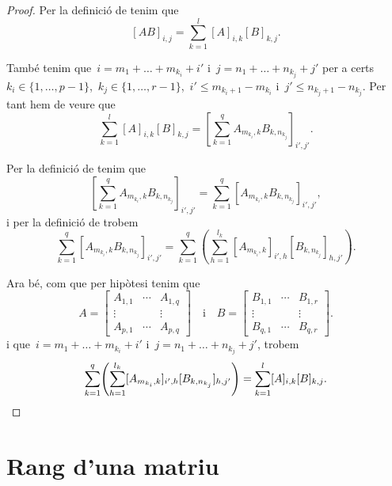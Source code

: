 \documentclass[../algebra-lineal.tex]{subfiles}
\begin{document}
    \begin{proof}
        Per la definició de  tenim que
        \[
            [AB]_{i,j}=\sum_{k=1}^{l}[A]_{i,k}[B]_{k,j}.
        \]

        També tenim que~\(i=m_{1}+\dots+m_{k_{i}}+i'\) i~\(j=n_{1}+\dots+n_{k_{j}}+j'\) per a certs~\(k_{i}\in\{1,\dots,p-1\}\),~\(k_{j}\in\{1,\dots,r-1\}\),~\(i'\leq m_{k_{i}+1}-m_{k_{i}}\) i~\(j'\leq n_{k_{j}+1}-n_{k_{j}}\).
        Per tant hem de veure que
        \[
            \sum_{k=1}^{l}[A]_{i,k}[B]_{k,j}=\left[\sum_{k=1}^{q}A_{m_{k_{i}},k}B_{k,n_{k_{j}}}\right]_{i',j'}.
        \]

        Per la definició de  tenim que
        \[
            \left[\sum_{k=1}^{q}A_{m_{k_{i}},k}B_{k,n_{k_{j}}}\right]_{i',j'}=\sum_{k=1}^{q}[A_{m_{k_{i}},k}B_{k,n_{k_{j}}}]_{i',j'},
        \]
        i per la definició de  trobem
        \[
            \sum_{k=1}^{q}[A_{m_{k_{i}},k}B_{k,n_{k_{j}}}]_{i',j'}=\sum_{k=1}^{q}\left(\sum_{h=1}^{l_{k}}[A_{m_{k_{i}},k}]_{i',h}[B_{k,n_{k_{j}}}]_{h,j'}\right).
        \]

        Ara bé, com que per hipòtesi tenim que
        \[A=\left[\begin{matrix}
        A_{1,1} & \cdots & A_{1,q} \\
        \vdots & & \vdots \\
        A_{p,1} & \cdots & A_{p,q}
        \end{matrix}\right]\quad\text{i}\quad B=\left[\begin{matrix}
        B_{1,1} & \cdots & B_{1,r} \\
        \vdots & & \vdots \\
        B_{q,1} & \cdots & B_{q,r}
        \end{matrix}\right].\]
        i que~\(i=m_{1}+\dots+m_{k_{i}}+i'\) i~\(j=n_{1}+\dots+n_{k_{j}}+j'\), trobem
        \[
            \sum_{k=1}^{q}\left(\sum_{h=1}^{l_{k}}[A_{m_{k_{i}},k}]_{i',h}[B_{k,n_{k_{j}}}]_{h,j'}\right)=\sum_{k=1}^{l}[A]_{i,k}[B]_{k,j}.\qedhere
        \]
    \end{proof}
\section{Rang d'una matriu}
\end{document}

